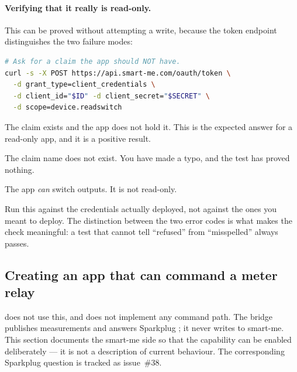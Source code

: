 \paragraph{Verifying that it really is read-only.} This can be proved without attempting a
write, because the token endpoint distinguishes the two failure modes:

\begin{lstlisting}[language=bash]
# Ask for a claim the app should NOT have.
curl -s -X POST https://api.smart-me.com/oauth/token \
  -d grant_type=client_credentials \
  -d client_id="$ID" -d client_secret="$SECRET" \
  -d scope=device.readswitch
\end{lstlisting}

\begin{description}[style=nextline]
  \item[\code{invalid\_request} — \emph{“This client application is not allowed to use the
        specified scope.”}] The claim exists and the app does not hold it. This is the
        expected answer for a read-only app, and it is a positive result.
  \item[\code{invalid\_scope}] The claim name does not exist. You have made a typo, and the
        test has proved nothing.
  \item[A token is returned] The app \emph{can} switch outputs. It is not read-only.
\end{description}

\begin{note}
Run this against the credentials actually deployed, not against the ones you meant to
deploy. The distinction between the two error codes is what makes the check meaningful: a
test that cannot tell “refused” from “misspelled” always passes.
\end{note}

\subsection{Creating an app that can command a meter relay}

\begin{warning}
\prog does not use this, and does not implement any command path. The bridge publishes
measurements and answers Sparkplug  ; it never writes
to smart-me. This section documents the smart-me side so that the capability can be
enabled deliberately — it is not a description of current behaviour. The corresponding
Sparkplug \code{DCMD} question is tracked as issue~\#38.
\end{warning}

